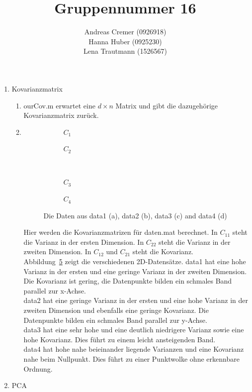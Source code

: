 \documentclass[]{report}
\title{Gruppennummer 16}
\author{Andreas Cremer (0926918)\\Hanna Huber (0925230) \\Lena Trautmann (1526567)}
\newlength\figureheight
\newlength\figurewidth
\begin{document}
	\maketitle
	
	
	\begin{enumerate}
		\item Kovarianzmatrix
		\begin{enumerate}
			\item
			ourCov.m erwartet eine $d \times n$ Matrix und gibt die dazugehörige Kovarianzmatrix zurück.
			\item
			\setlength\figureheight{3.5cm}
			\setlength{}
			\begin{figure}
				\begin{subfigure}{0.45\textwidth}
					\centering
					
					\caption{$C_{1}$}
					\label{fig:cov1}
				\end{subfigure}
				\qquad
				\begin{subfigure}{0.45\textwidth}
					\centering
					
					\caption{$C_{2}$}
					\label{fig:cov2}
				\end{subfigure}	
				\\
				\begin{subfigure}{0.45\textwidth}
					\centering
					
					\caption{$C_{3}$}
					\label{fig:cov3}
				\end{subfigure}
				\qquad
				\begin{subfigure}{0.45\textwidth}
					\centering
					
					\caption{$C_{4}$}
					\label{fig:cov4}
				\end{subfigure}	
				\caption{Die Daten aus data1 (a), data2 (b), data3 (c) and data4 (d)}
				\label{fig:cov}
			\end{figure}
			
			Hier werden die Kovarianzmatrizen für daten.mat berechnet. In $C_{11}$ steht die Varianz in der ersten Dimension. In $C_{22}$ steht die Varianz in der zweiten Dimension. In $C_{12}$ und $C_{21}$ steht die Kovarianz.\\
			Abbildung~\ref{fig:cov} zeigt die verschiedenen 2D-Datensätze. data1 hat eine hohe Varianz in der ersten und eine geringe Varianz in der zweiten Dimension. Die Kovarianz ist gering, die Datenpunkte bilden ein schmales Band parallel zur x-Achse.\\
			data2 hat eine geringe Varianz in der ersten und eine hohe Varianz in der zweiten Dimension und ebenfalls eine geringe Kovarianz. Die Datenpunkte bilden ein schmales Band parallel zur y-Achse.\\
			data3 hat eine sehr hohe und eine deutlich niedrigere Varianz sowie eine hohe Kovarianz. Dies führt zu einem leicht ansteigenden Band.\\
			data4 hat hohe nahe beieinander liegende Varianzen und eine Kovarianz nahe beim Nullpunkt. Dies führt zu einer Punktwolke ohne erkennbare Ordnung.
		\end{enumerate}
		\item PCA\\
		

\end{enumerate}
\end{document}
